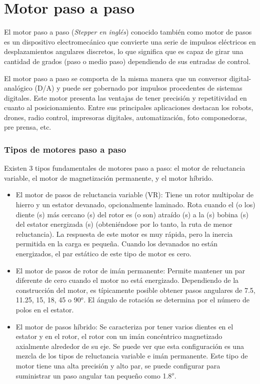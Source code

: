 \documentclass[../main]{subfiles}
\begin{document}
\pagestyle{empty}
\chapter{Motor paso a paso}
\normalsize
El motor paso a paso (\emph{Stepper en inglés}) conocido también como
motor de pasos es
un dispositivo electromecánico que convierte una serie de impulsos eléctricos
en desplazamientos angulares discretos, lo que significa que es capaz de girar
una cantidad de grados (paso o medio paso) dependiendo de sus
entradas de control.


El motor paso a paso se comporta de la misma manera que un conversor
digital-analógico
(D/A) y puede ser gobernado por impulsos procedentes de sistemas digitales.
Este motor presenta las ventajas de tener precisión y repetitividad
en cuanto al posicionamiento. Entre sus principales aplicaciones
destacan los robots,
drones, radio control, impresoras digitales, automatización,
foto componedoras, pre prensa, etc.


\subsection{Tipos de motores paso a paso}
Existen 3 tipos fundamentales de motores paso a paso: el motor de
reluctancia variable, el motor de magnetización permanente, y el motor híbrido.
\begin{itemize}

  \item El motor de pasos de reluctancia variable (VR): Tiene un
    rotor multipolar de hierro y un estator devanado, opcionalmente
    laminado. Rota cuando el (o los) diente (s) más cercano (s) del
    rotor es (o son) atraído (s) a la (s) bobina (s) del estator
    energizada (s) (obteniéndose por lo tanto, la ruta de menor
    reluctancia). La respuesta de este motor es muy rápida, pero la
    inercia permitida en la carga es pequeña. Cuando los devanados no
    están energizados, el par estático de este tipo de motor es cero.

  \item El motor de pasos de rotor de imán permanente: Permite
    mantener un par diferente de cero cuando el motor no está
    energizado. Dependiendo de la construcción del motor, es
    típicamente posible obtener pasos angulares de 7.5, 11.25, 15,
    18, 45 o 90$^o$. El ángulo de rotación se determina por el número
    de polos en el estator.

  \item El motor de pasos híbrido: Se caracteriza por tener varios
    dientes en el estator y en el rotor, el rotor con un imán
    concéntrico magnetizado axialmente alrededor de su eje. Se puede
    ver que esta configuración es una mezcla de los tipos de
    reluctancia variable e imán permanente. Este tipo de motor tiene
    una alta precisión y alto par, se puede configurar para
    suministrar un paso angular tan pequeño como 1.8$^o$.

\end{itemize}
\end{document}
